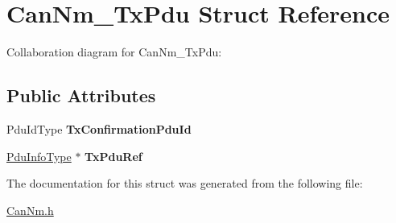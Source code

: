 \hypertarget{structCanNm__TxPdu}{}\section{Can\+Nm\+\_\+\+Tx\+Pdu Struct Reference}
\label{structCanNm__TxPdu}


Collaboration diagram for Can\+Nm\+\_\+\+Tx\+Pdu\+:
\subsection*{Public Attributes}
\begin{DoxyCompactItemize}
\item 
Pdu\+Id\+Type {\bfseries Tx\+Confirmation\+Pdu\+Id}\hypertarget{structCanNm__TxPdu_a74a10049852e962d16f4a3dfb1595705}{}\label{structCanNm__TxPdu_a74a10049852e962d16f4a3dfb1595705}

\item 
\hyperlink{structPduInfoType}{Pdu\+Info\+Type} $\ast$ {\bfseries Tx\+Pdu\+Ref}\hypertarget{structCanNm__TxPdu_ad4ce50b958b1594a5e48f6135b40da79}{}\label{structCanNm__TxPdu_ad4ce50b958b1594a5e48f6135b40da79}

\end{DoxyCompactItemize}


The documentation for this struct was generated from the following file\+:\begin{DoxyCompactItemize}
\item 
\hyperlink{CanNm_8h}{Can\+Nm.\+h}\end{DoxyCompactItemize}
